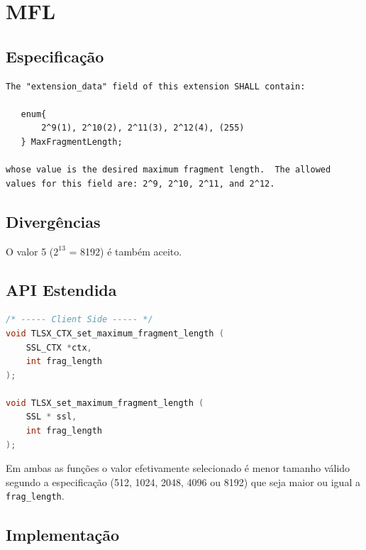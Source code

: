 
\section{\acl{MFL}}

\subsection{Especificação}

\begin{lstlisting}[caption={RFC 3546, trecho da seção 3.2}]
The "extension_data" field of this extension SHALL contain: 
 
   enum{ 
       2^9(1), 2^10(2), 2^11(3), 2^12(4), (255) 
   } MaxFragmentLength; 
 
whose value is the desired maximum fragment length.  The allowed 
values for this field are: 2^9, 2^10, 2^11, and 2^12.
\end{lstlisting}

\subsection{Divergências}

O valor 5 ($2^{13}$ = 8192) é também aceito.

\subsection{API Estendida}

\begin{lstlisting}[language=C,%
		    emph={TLSX_CTX_set_maximum_fragment_length,TLSX_set_maximum_fragment_length},%
		    caption=API para a extensão \acs{MFL}]
/* ----- Client Side ----- */
void TLSX_CTX_set_maximum_fragment_length (
	SSL_CTX *ctx,
	int frag_length
);

void TLSX_set_maximum_fragment_length (
	SSL * ssl,
	int frag_length 
);
\end{lstlisting}

Em ambas as funções o valor efetivamente selecionado é menor tamanho válido 
segundo a especificação (512, 1024, 2048, 4096 ou 8192) que seja maior ou igual 
a \verb|frag_length|.

\subsection{Implementação}

